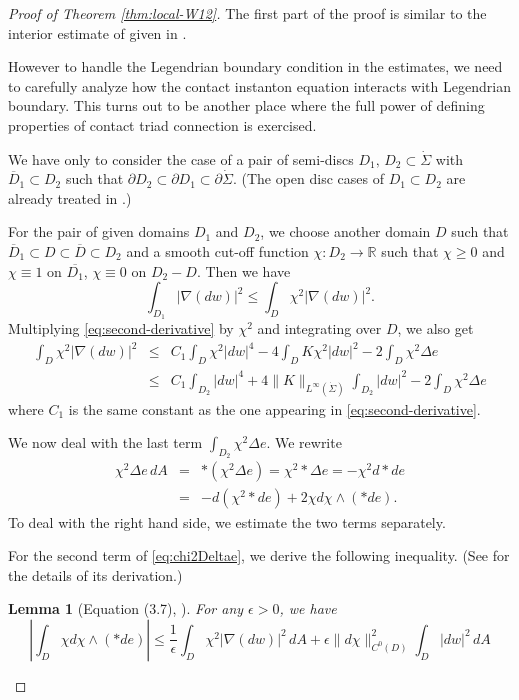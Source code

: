 \documentclass[reqno]{amsart}
\def\R{\ifmmode{\mathbb R}\else{$\mathbb R$}\fi} %
\newcommand{\del}{\partial}
\newcommand{\be}{\begin{equation}}
\newcommand{\ee}{\end{equation}}
\newcommand{\bea}{\begin{eqnarray}}
\newcommand{\eea}{\end{eqnarray}}
\theoremstyle{theorem}
\newtheorem{lem}[thm]{Lemma}
\theoremstyle{definition}
\numberwithin{equation}{section}
\def\R{{\mathbb R}}
\def\R{{\mathbb R}}
\def\R{\ifmmode{\mathbb R}\else{$\mathbb R$}\fi} %
\def\R{{\mathbb R}}
\def\R{{\mathbb R}}
\begin{document}
\begin{proof} [Proof of Theorem \ref{thm:local-W12}]
The first part of the proof is similar to
the interior estimate of \cite[Proposition 5.3]{oh-wang:CR-map1} given in
\cite[Appendix C]{oh-wang:CR-map1}.

However  to handle the Legendrian boundary condition in the estimates,
we need to carefully analyze how the contact instanton equation interacts with
Legendrian boundary. This turns out to be another place where the full power of
defining properties of contact triad connection is exercised.

We have only to consider the case of a pair of semi-discs $D_1,\, D_2 \subset \dot \Sigma$
with $\overline D_1 \subset D_2$ such that $\del D_2 \subset \del D_1 \subset \del \dot \Sigma$.
(The open disc cases of $D_1 \subset D_2$ are already treated in \cite[Appendix C]{oh-wang:CR-map1}.)

For the pair of given domains $D_1$ and $D_2$, we choose another domain $D$ such that
$\overline D_1 \subset D \subset \overline D \subset D_2$ and a smooth cut-off function $\chi:D_2\to \R$ such that
$\chi\geq 0$ and
$\chi\equiv 1$ on $\overline{D_1}$, $\chi\equiv 0$ on $D_2-D$. Then we have
$$
\int_{D_1}|\nabla(dw)|^2 \leq \int_{D}\chi^2|\nabla(dw)|^2.
$$
Multiplying  \eqref{eq:second-derivative} by $\chi^2$ and integrating over $D$, we
also get
\bea\label{eq:intchi2}
\int_{D}\chi^2|\nabla(dw)|^2
&\leq&C_1\int_{D}\chi^2|dw|^4-4\int_{D}K\chi^2|dw|^2-2\int_{D}\chi^2\Delta e \nonumber\\
&\leq&C_1\int_{D_2}|dw|^4+4\|K\|_{L^\infty(\dot\Sigma)}\int_{D_2}|dw|^2-2\int_{D}\chi^2\Delta e
\eea
where $C_1$ is the same constant as the one appearing in \eqref{eq:second-derivative}.

We now deal with the last term $\int_{D_2}\chi^2 \Delta e$.
We rewrite
\bea\label{eq:chi2Deltae}
\chi^2\Delta e\, dA&=&*(\chi^2 \Delta e)=\chi^2 *\Delta e
=-\chi^2 d*de \nonumber\\
&=&-d(\chi^2 *de)+2\chi d\chi\wedge (*de).
\eea
To deal with the right hand side, we estimate the two terms separately.

For the second term of \eqref{eq:chi2Deltae}, we derive the following inequality.
(See \cite[p.677]{oh-wang:CR-map1} for the details of its derivation.)

\begin{lem}[Equation (3.7), \cite{oh-wang:CR-map1}]
For any $\epsilon > 0$, we have
\be\label{eq:second-term}
\left|\int_{D}\chi d\chi\wedge(*de)\right| \leq
\frac{1}{\epsilon}\int_{D}\chi^2|\nabla(dw)|^2\,dA+\epsilon\|d\chi\|_{C^0(D)}^2\int_{D}|dw|^2\,dA
\ee
\end{lem}


\end{proof}
\end{document}
